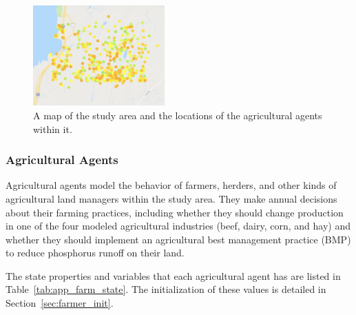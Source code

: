 \begin{figure}
    \centering
    \includegraphics[width=0.45\textwidth]{figure/farm-sample-2001.png}
    \caption{A map of the study area and the locations of the agricultural
    agents within it.}
    \label{fig:app_map}
\end{figure}

\subsubsection{Agricultural Agents}

Agricultural agents model the behavior of farmers, herders, and other kinds of agricultural land managers within the study area. They make annual decisions about their farming practices, including whether they should change production in one of the four modeled agricultural industries (beef, dairy, corn, and hay) and whether they should implement an agricultural best management practice (BMP) to reduce phosphorus runoff on their land.

The state properties and variables that each agricultural agent
has are listed in Table~\ref{tab:app_farm_state}.
The initialization of these values is detailed in
Section~\ref{sec:farmer_init}.

